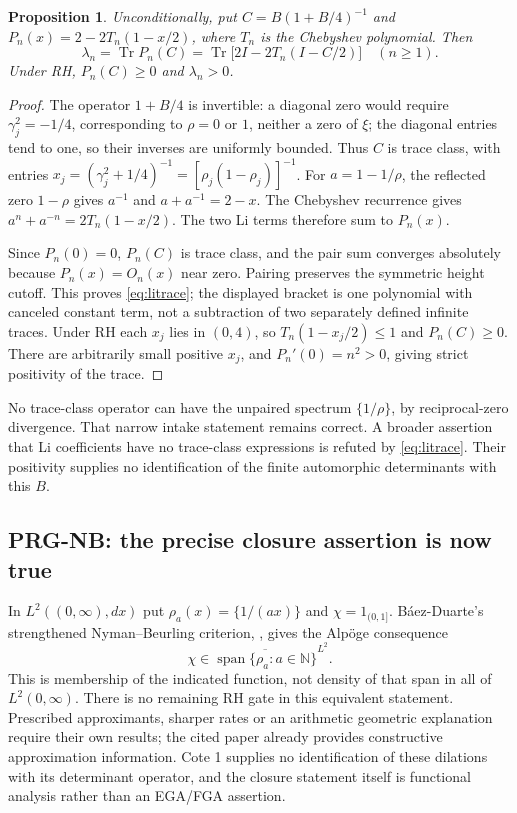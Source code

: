 \documentclass[11pt,a4paper]{article}
\newcommand{\Tr}{\operatorname{Tr}}
\newtheorem*{proposition}{Proposition}
\begin{document}
\begin{proposition}
Unconditionally, put $C=B(1+B/4)^{-1}$ and $P_n(x)=2-2T_n(1-x/2)$, where $T_n$ is the Chebyshev polynomial. Then
\begin{equation}\label{eq:litrace}
 \lambda_n=\Tr P_n(C)=\Tr\bigl[2I-2T_n(I-C/2)\bigr]\quad(n\ge1).
\end{equation}
Under RH, $P_n(C)\ge0$ and $\lambda_n>0$.
\end{proposition}
\begin{proof}
The operator $1+B/4$ is invertible: a diagonal zero would require $\gamma_j^2=-1/4$, corresponding to $\rho=0$ or $1$, neither a zero of $\xi$; the diagonal entries tend to one, so their inverses are uniformly bounded. Thus $C$ is trace class, with entries
$x_j=(\gamma_j^2+1/4)^{-1}=[\rho_j(1-\rho_j)]^{-1}$.
For $a=1-1/\rho$, the reflected zero $1-\rho$ gives $a^{-1}$ and
$a+a^{-1}=2-x$. The Chebyshev recurrence gives
$a^n+a^{-n}=2T_n(1-x/2)$. The two Li terms therefore sum to $P_n(x)$.

Since $P_n(0)=0$, $P_n(C)$ is trace class, and the pair sum converges absolutely because $P_n(x)=O_n(x)$ near zero. Pairing preserves the symmetric height cutoff. This proves \eqref{eq:litrace}; the displayed bracket is one polynomial with canceled constant term, not a subtraction of two separately defined infinite traces. Under RH each $x_j$ lies in $(0,4)$, so $T_n(1-x_j/2)\le1$ and $P_n(C)\ge0$. There are arbitrarily small positive $x_j$, and $P_n'(0)=n^2>0$, giving strict positivity of the trace.
\end{proof}
No trace-class operator can have the unpaired spectrum $\{1/\rho\}$, by reciprocal-zero divergence. That narrow intake statement remains correct. A broader assertion that Li coefficients have no trace-class expressions is refuted by \eqref{eq:litrace}. Their positivity supplies no identification of the finite automorphic determinants with this $B$.

\subsection{PRG-NB: the precise closure assertion is now true}
In $L^2((0,\infty),dx)$ put $\rho_a(x)=\{1/(ax)\}$ and $\chi=1_{(0,1]}$. B\'aez-Duarte's strengthened Nyman--Beurling criterion, \cite[Theorem 1.1]{baez}, gives the Alp\"oge consequence
\[
 \chi\in\overline{\operatorname{span}\{\rho_a:a\in\mathbb N\}}^{L^2}.
\]
This is membership of the indicated function, not density of that span in all of $L^2(0,\infty)$. There is no remaining RH gate in this equivalent statement. Prescribed approximants, sharper rates or an arithmetic geometric explanation require their own results; the cited paper already provides constructive approximation information. Cote 1 supplies no identification of these dilations with its determinant operator, and the closure statement itself is functional analysis rather than an EGA/FGA assertion.
\end{document}
